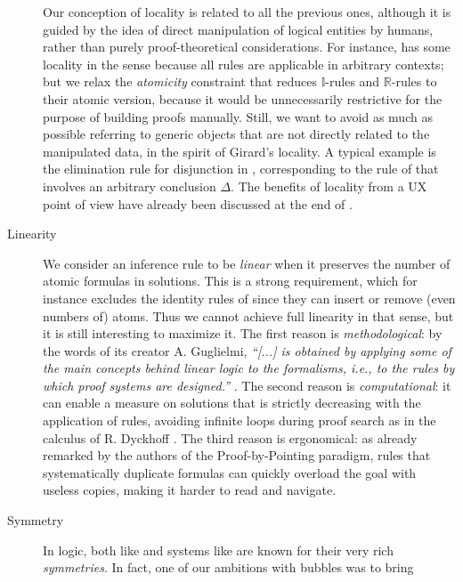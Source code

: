 \begin{description}
    Our conception of locality is related to all the previous ones, although it
    is guided by the idea of direct manipulation of logical entities by humans,
    rather than purely proof-theoretical considerations. For instance, 
    has some locality in the  sense because all rules are
    applicable in arbitrary contexts; but we relax the \emph{atomicity}
    constraint that reduces $\mathbb{I}$-rules and $\mathbb{R}$-rules to their
    atomic version, because it would be unnecessarily restrictive for the
    purpose of building proofs manually. Still, we want to avoid as much as
    possible referring to generic objects that are not directly related to the
    manipulated data, in the spirit of Girard's locality. A typical example is
    the elimination rule for disjunction in , corresponding to
    the {\rsf{{\lor}{-}}} rule of  that involves an arbitrary
    conclusion $\Delta$. The benefits of locality from a UX point of view have
    already been discussed at the end of .
  \item[Linearity] 
    We consider an inference rule to be \emph{linear} when it preserves the
    number of atomic formulas in solutions. This is a strong requirement, which
    for instance excludes the identity rules of  since they can insert
    or remove (even numbers of) atoms. Thus we cannot achieve full linearity in
    that sense, but it is still interesting to maximize it. The first reason is
    \emph{methodological}: by the words of its creator A. Guglielmi,
    \textit{``[...]  is obtained by applying some of the main
    concepts behind linear logic to the formalisms, i.e., to the rules by which
    proof systems are designed.''} . The second reason
    is \emph{computational}: it can enable a measure on solutions that is
    strictly decreasing with the application of rules, avoiding infinite loops
    during proof search as in the calculus  of R. Dyckhoff
    \cite{dyckhoff_contraction-free_1992}. The third reason is ergonomical: as
    already remarked by the authors of the Proof-by-Pointing
    paradigm, rules that systematically
    duplicate formulas can quickly overload the goal with useless copies, making
    it harder to read and navigate.
  \item[Symmetry] 
    In  logic, both  like  and  systems like  are known for their very rich
    \emph{symmetries}. In fact, one of our ambitions with bubbles was to bring

\end{description}
